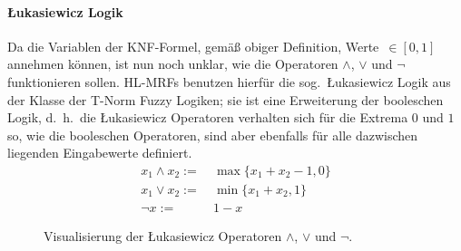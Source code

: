 \paragraph{Łukasiewicz Logik}
Da die Variablen der KNF-Formel, gemäß obiger Definition, Werte~$\in [0, 1]$ annehmen können, ist nun noch unklar, wie die Operatoren $\land$, $\lor$ und $\lnot$ funktionieren sollen.
HL-MRFs benutzen hierfür die sog.\ Łukasiewicz Logik aus der Klasse der T-Norm Fuzzy Logiken;
sie ist eine Erweiterung der booleschen Logik, d.~h.\ die Łukasiewicz Operatoren verhalten sich für die Extrema $0$ und $1$ so, wie die booleschen Operatoren, sind aber ebenfalls für alle dazwischen liegenden Eingabewerte definiert.
\begin{align}
	x_1 \land x_2 :=&\ \max\{ x_1 + x_2 - 1, 0 \} \\ %
	x_1 \lor x_2 :=&\ \min\{ x_1 + x_2, 1 \} \\ %
	\lnot x :=&\ 1 - x
\end{align}
\begin{figure}[h]
	\centering
	\caption{Visualisierung der Łukasiewicz Operatoren $\land$, $\lor$ und $\lnot$.}\label{fig:theory:luklogic}
\end{figure} \\
